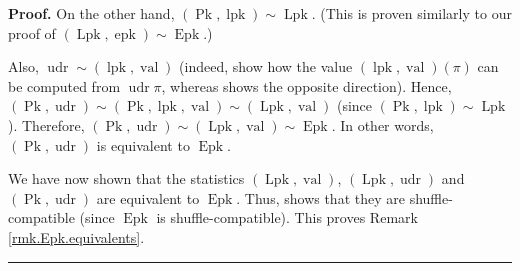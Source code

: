 \documentclass[numbers=enddot,12pt,final,onecolumn,notitlepage]{scrartcl}%
\theoremstyle{definition}
\newenvironment{proof}[1][Proof]{\noindent\textbf{#1.} }{\ \rule{0.5em}{0.5em}}
\begin{document}
\begin{proof}
On the other hand, $\left(  \operatorname*{Pk},\operatorname*{lpk}\right)
\sim\operatorname*{Lpk}$. (This is proven similarly to our proof of $\left(
\operatorname*{Lpk},\operatorname*{epk}\right)  \sim\operatorname*{Epk}$.)

Also, $\operatorname*{udr}\sim\left(  \operatorname*{lpk},\operatorname*{val}%
\right)  $ (indeed, \cite[Lemma 2.2 \textbf{(b)} and \textbf{(c)}]{part1} show
how the value $\left(  \operatorname*{lpk},\operatorname*{val}\right)  \left(
\pi\right)  $ can be computed from $\operatorname*{udr}\pi$, whereas
\cite[Lemma 2.2 \textbf{(a)}]{part1} shows the opposite direction). Hence,
$\left(  \operatorname*{Pk},\operatorname*{udr}\right)  \sim\left(
\operatorname*{Pk},\operatorname*{lpk},\operatorname*{val}\right)  \sim\left(
\operatorname*{Lpk},\operatorname*{val}\right)  $ (since $\left(
\operatorname*{Pk},\operatorname*{lpk}\right)  \sim\operatorname*{Lpk}$).
Therefore, $\left(  \operatorname*{Pk},\operatorname*{udr}\right)  \sim\left(
\operatorname*{Lpk},\operatorname*{val}\right)  \sim\operatorname*{Epk}$. In
other words, $\left(  \operatorname*{Pk},\operatorname*{udr}\right)  $ is
equivalent to $\operatorname*{Epk}$.

We have now shown that the statistics $\left(  \operatorname*{Lpk}%
,\operatorname*{val}\right)  $, $\left(  \operatorname*{Lpk}%
,\operatorname*{udr}\right)  $ and $\left(  \operatorname*{Pk}%
,\operatorname*{udr}\right)  $ are equivalent to $\operatorname*{Epk}$. Thus,
\cite[Theorem 3.2]{part1} shows that they are shuffle-compatible (since
$\operatorname*{Epk}$ is shuffle-compatible). This proves Remark
\ref{rmk.Epk.equivalents}.
\end{proof}
\end{document}
